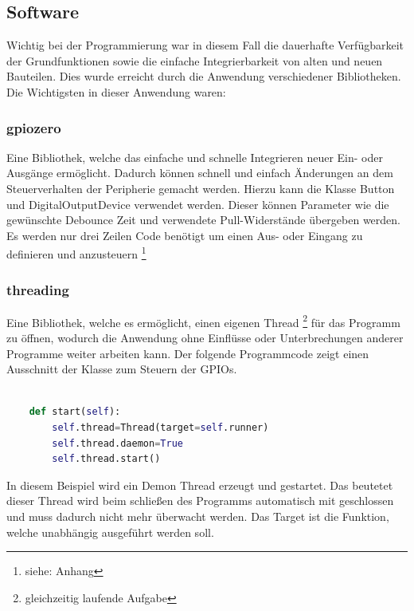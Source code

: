 \subsection{Software}

Wichtig bei der Programmierung war in diesem Fall die dauerhafte Verfügbarkeit der Grundfunktionen  sowie die einfache Integrierbarkeit von alten und neuen Bauteilen. Dies wurde erreicht durch die Anwendung verschiedener Bibliotheken.\\
Die Wichtigsten in dieser Anwendung waren: \\

\subsubsection{gpiozero}

Eine Bibliothek, welche das einfache und schnelle Integrieren neuer Ein- oder Ausgänge ermöglicht. Dadurch können schnell und einfach Änderungen an dem Steuerverhalten der Peripherie gemacht werden. Hierzu kann die Klasse Button und DigitalOutputDevice verwendet werden. Dieser können Parameter wie die gewünschte Debounce Zeit und verwendete Pull-Widerstände übergeben werden. Es werden nur drei Zeilen Code benötigt um einen Aus- oder Eingang zu definieren und anzusteuern \footnote{siehe: Anhang}

\subsubsection{threading} \label{sec:thread}

Eine Bibliothek, welche es ermöglicht, einen eigenen Thread \footnote{gleichzeitig laufende Aufgabe} für das Programm zu öffnen, wodurch die Anwendung ohne Einflüsse oder Unterbrechungen anderer Programme weiter arbeiten kann. Der folgende Programmcode zeigt einen Ausschnitt der Klasse zum Steuern der GPIOs. 

\begin{lstlisting}[language=Python, caption={Code zum Starten eines Threads},captionpos=b]
	
	def start(self):
		self.thread=Thread(target=self.runner)
		self.thread.daemon=True
		self.thread.start()

\end{lstlisting}

In diesem Beispiel wird ein Demon Thread erzeugt und gestartet. Das beutetet dieser Thread wird beim schließen des Programms automatisch mit geschlossen und muss dadurch nicht mehr überwacht werden. Das Target ist die Funktion, welche unabhängig ausgeführt werden soll.

